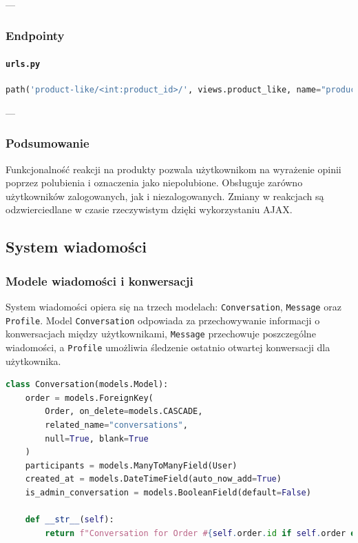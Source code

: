 \documentclass[12pt,a4paper,oneside]{article}
\theoremstyle{definition}
\numberwithin{equation}{section}
\begin{document}
---

\subsubsection{Endpointy}

\paragraph{\texttt{urls.py}}
\begin{lstlisting}[language=Python, caption=Endpoint dla widoku \texttt{product\_like}]
path('product-like/<int:product_id>/', views.product_like, name="product_like"),
\end{lstlisting}

---

\subsubsection{Podsumowanie}
Funkcjonalność reakcji na produkty pozwala użytkownikom na wyrażenie opinii poprzez polubienia i oznaczenia jako niepolubione. Obsługuje zarówno użytkowników zalogowanych, jak i niezalogowanych. Zmiany w reakcjach są odzwierciedlane w czasie rzeczywistym dzięki wykorzystaniu AJAX.


% 
% 

\subsection{System wiadomości}

\subsubsection{Modele wiadomości i konwersacji}
System wiadomości opiera się na trzech modelach: \texttt{Conversation}, \texttt{Message} oraz \texttt{Profile}. Model \texttt{Conversation} odpowiada za przechowywanie informacji o konwersacjach między użytkownikami, \texttt{Message} przechowuje poszczególne wiadomości, a \texttt{Profile} umożliwia śledzenie ostatnio otwartej konwersacji dla użytkownika.

\begin{lstlisting}[language=Python, caption=Model \texttt{Conversation}]
class Conversation(models.Model):
    order = models.ForeignKey(
        Order, on_delete=models.CASCADE,
        related_name="conversations",
        null=True, blank=True
    )
    participants = models.ManyToManyField(User)
    created_at = models.DateTimeField(auto_now_add=True)
    is_admin_conversation = models.BooleanField(default=False)

    def __str__(self):
        return f"Conversation for Order #{self.order.id if self.order else 'General'} (Admin: {self.is_admin_conversation})"
\end{lstlisting}
\end{document}
